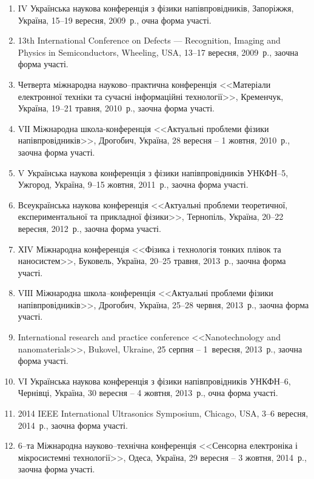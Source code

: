 \begin{enumerate}[label=\arabic*.,leftmargin=1em,itemindent=1em]
\item
IV Українська наукова конференція з фізики напівпровідників, Запоріжжя, Україна, 15--19 вересня, 2009~р., очна форма участі.

\item
13th International Conference on Defects --- Recognition, Imaging and Physics in Semiconductors, Wheeling, USA, 13--17 вересня, 2009~р., заочна форма участі.

\item
Четверта міжнародна науково--практична конференція <<Матеріали електронної техніки та сучасні інформаційні технології>>, Кременчук, Україна, 19--21 травня, 2010~р., заочна форма участі.

\item
VІІ Міжнародна школа-конференція <<Актуальні проблеми фізики напівпровідників>>, Дрогобич, Україна, 28 вересня -- 1 жовтня, 2010~р., заочна форма участі.

\item
V Українська наукова конференція з фізики напівпровідників УНКФН--5, Ужгород, Україна, 9--15 жовтня, 2011~р., заочна форма участі.

\item
Всеукраїнська наукова конференція <<Актуальні проблеми теоретичної, експериментальної та прикладної фізики>>, Тернопіль, Україна, 20--22 вересня, 2012~р., заочна форма участі.

\item
ХІV Міжнародна конференція <<Фізика і технологія тонких плівок та наносистем>>, Буковель, Україна, 20--25 травня, 2013~р., заочна форма участі.

\item
VІІI Міжнародна школа--конференція <<Актуальні проблеми фізики напівпровідників>>, Дрогобич, Україна, 25--28 червня, 2013~р., заочна форма участі.

\item
International research and practice conference <<Nanotechnology and nanomaterials>>, Bukovel, Ukraine, 25 серпня -- 1~вересня, 2013~р., заочна форма участі.

\item
VІ Українська наукова конференція з фізики напівпровідників УНКФН--6, Чернівці, Україна, 30 вересня -- 4 жовтня, 2013~р., очна форма участі.

\item
2014 IEEE International Ultrasonics Symposium, Chicago, USA, 3--6 вересня, 2014~р., заочна форма участі.

\item
6--та Міжнародна науково--технічна конференція <<Сенсорна електроніка і мікросистемні технології>>, Одеса, Україна, 29 вересня -- 3 жовтня, 2014~р., заочна форма участі.


\end{enumerate}
